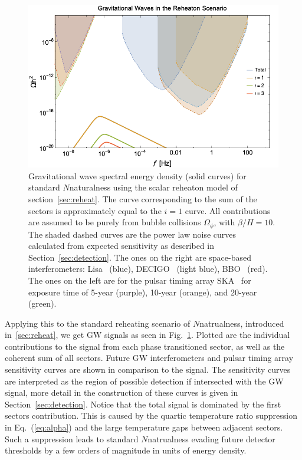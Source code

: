 \documentclass[nofootinbib,twocolumn,preprintnumbers]{revtex4-1}
\begin{document}
\begin{figure}[h!]
\centering
\includegraphics[scale=.3]{Nnatral.png} 
\caption{ Gravitational wave spectral energy density (solid curves) for standard $N$naturalness using the scalar reheaton model of section~\ref{sec:reheat}. The curve corresponding to the sum of the sectors is approximately equal to the $i=1$ curve. All contributions are assumed to be purely from bubble collisions $\Omega_{\phi}$, with $\beta/H  = 10$.  The shaded dashed curves are the power law noise curves~\cite{PhysRevD.88.124032} calculated from expected sensitivity as described in Section~\ref{sec:detection}. The ones on the right are space-based interferometers: Lisa~\citep{Audley:2017drz} (blue), DECIGO~\citep{10.1093/ptep/pty078} (light blue), BBO~\citep{PhysRevD.72.083005} (red). The ones on the left are for the pulsar timing array SKA~\cite{Janssen:2014dka} for exposure time of 5-year (purple), 10-year (orange), and 20-year (green). }
\label{fig::Nnatural}
\end{figure}
Applying this to the standard reheating scenario of $N$natrualness, introduced in~\ref{sec:reheat}, we get GW signals as seen in Fig.~\ref{fig::Nnatural}. Plotted are the individual contributions to the signal from each phase transitioned sector, as well as the coherent sum of all sectors. Future GW interferometers and pulsar timing array sensitivity curves are shown in comparison to the signal. The sensitivity curves are interpreted as the region of possible detection if intersected with the GW signal, more detail in the construction of these curves is given in Section~\ref{sec:detection}. Notice that the total signal is dominated by the first sectors contribution. This is caused by the quartic temperature ratio suppression in Eq.~(\ref{eq:alpha}) and the large temperature gaps between adjacent sectors. Such a suppression leads to standard $N$natrualness evading future detector thresholds by a few orders of magnitude in units of energy density. 
\end{document}
